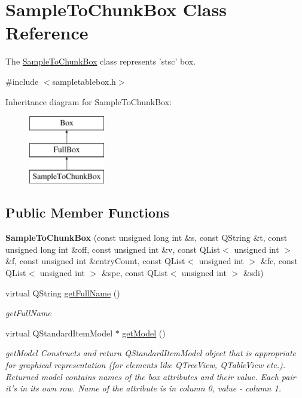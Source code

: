 \hypertarget{class_sample_to_chunk_box}{\section{Sample\-To\-Chunk\-Box Class Reference}
\label{class_sample_to_chunk_box}
}


The \hyperlink{class_sample_to_chunk_box}{Sample\-To\-Chunk\-Box} class represents 'stsc' box.  




{\ttfamily \#include $<$sampletablebox.\-h$>$}

Inheritance diagram for Sample\-To\-Chunk\-Box\-:\begin{figure}[H]
\begin{center}
\leavevmode
\includegraphics[height=3.000000cm]{class_sample_to_chunk_box}
\end{center}
\end{figure}
\subsection*{Public Member Functions}
\begin{DoxyCompactItemize}
\item 
\hypertarget{class_sample_to_chunk_box_a40da981938222d747e1e165b24f57b13}{{\bfseries Sample\-To\-Chunk\-Box} (const unsigned long int \&s, const Q\-String \&t, const unsigned long int \&off, const unsigned int \&v, const Q\-List$<$ unsigned int $>$ \&f, const unsigned int \&entry\-Count, const Q\-List$<$ unsigned int $>$ \&fc, const Q\-List$<$ unsigned int $>$ \&spc, const Q\-List$<$ unsigned int $>$ \&sdi)}\label{class_sample_to_chunk_box_a40da981938222d747e1e165b24f57b13}

\item 
virtual Q\-String \hyperlink{class_sample_to_chunk_box_a298e53e6d563e66b7b910f99caeac0c3}{get\-Full\-Name} ()
\begin{DoxyCompactList}\small\item\em get\-Full\-Name \end{DoxyCompactList}\item 
virtual Q\-Standard\-Item\-Model $\ast$ \hyperlink{class_sample_to_chunk_box_a503e73d6fda55a6dcbbf4c2b035d6fb8}{get\-Model} ()
\begin{DoxyCompactList}\small\item\em get\-Model Constructs and return Q\-Standard\-Item\-Model object that is appropriate for graphical representation (for elements like Q\-Tree\-View, Q\-Table\-View etc.). Returned model contains names of the box attributes and their value. Each pair it's in its own row. Name of the attribute is in column 0, value -\/ column 1. \end{DoxyCompactList}\end{DoxyCompactItemize}
